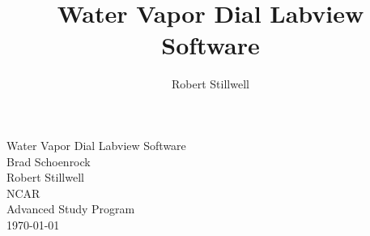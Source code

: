 \documentclass{article} %
\title{Water Vapor Dial Labview Software}
\author{Robert Stillwell}
\begin{document}
                    
\begin{center}
{\sc \LARGE Water Vapor Dial Labview Software} \\
\vspace{0.25in}
{\sc \Large Brad Schoenrock\\}
{\sc \Large Robert Stillwell\\}
\vspace{0.5in}
{\large NCAR
\\Advanced Study Program
\\ \today}
\end{center}
\vspace{0.5in}
\thispagestyle{empty}

\newpage                               	%
\tableofcontents                     	%
\thispagestyle{empty}		%
\newpage      				%
\setcounter{page}{1}            	%


















\end{document}
